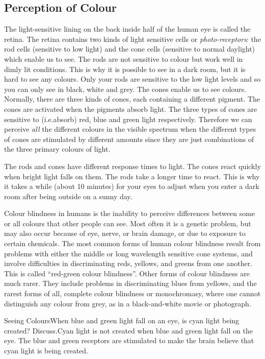 \subsection{Perception of Colour}
The light-sensitive lining on the back inside half of the human eye is called the retina. 
The retina contains two kinds of light sensitive cells or \textit{photo-receptors}: the rod cells (sensitive to low light) and the cone cells (sensitive to normal daylight) which enable us to see. The rods are not sensitive to colour but work well in dimly lit conditions. This is why it is possible to see in a dark room, but it is hard to see any colours. Only your rods are sensitive to the low light levels and so you can only see in black, white and grey.
The cones enable us to see colours.
Normally, there are three kinds of cones, each containing a different pigment. The cones are activated when the pigments absorb light. 
The three types of cones are sensitive to (i.e.\@ absorb) red, blue and green light respectively. Therefore we can perceive \textit{all} the different colours in the visible spectrum when the different types of cones are stimulated by different amounts since they are just combinations of the three primary colours of light.

The rods and cones have different response times to light. The cones react quickly when bright light falls on them. The rods take a longer time to react. This is why it takes a while (about 10 minutes) for your eyes to adjust when you enter a dark room after being outside on a sunny day. 


\begin{IFact}
{Colour blindness in humans is the inability to perceive differences between some or all colours that other people can see. Most often it is a genetic problem, but may also occur because of eye, nerve, or brain damage, or due to exposure to certain chemicals. The most common forms of human colour blindness result from problems with either the middle or long wavelength sensitive cone systems, and involve difficulties in discriminating reds, yellows, and greens from one another. This is called ``red-green colour blindness''. Other forms of colour blindness are much rarer. They include problems in discriminating blues from yellows, and the rarest forms of all, complete colour blindness or monochromasy, where one cannot distinguish any colour from grey, as in a black-and-white movie or photograph.}
\end{IFact}
\begin{wex}{Seeing Colours}{When blue and green light fall on an eye, is cyan light being created? Discuss.}{Cyan light is not created when blue and green light fall on the eye. The blue and green receptors are stimulated to make the brain believe that cyan light is being created.}
\end{wex}

